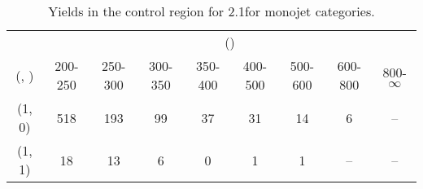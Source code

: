 \begin{table}[h!]
\tiny
\centering
\caption{Yields in the \mmj control region for 2.1\ifb for monojet categories.\label{tab:yieldssep_mumu_data_mono}}
\begin{tabular}
{ccccccccc}
	\hline\hline
	& \multicolumn{8}{c}{\scalht (\gev)} \\ 
	 (\njet,  \nb) & 200-250 & 250-300 & 300-350 & 350-400 & 400-500 & 500-600 & 600-800 & 800-$\infty$ \\ [0.8ex] 
\hline
	(1, 0) & 518 & 193 & 99 & 37 & 31 & 14 & 6 & -- \\[0.5ex] 
	(1, 1) & 18 & 13 & 6 & 0 & 1 & 1 & -- & -- \\[0.5ex] 
	\hline
	\hline
\end{tabular}
\end{table}
